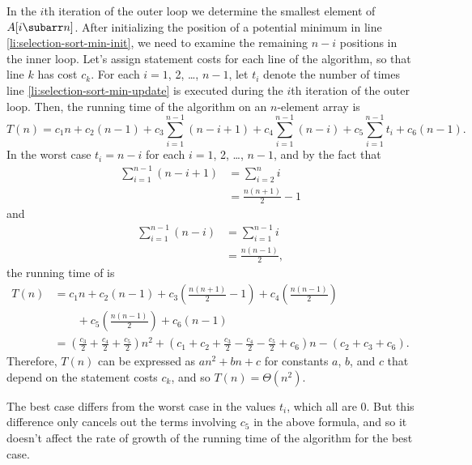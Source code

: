 In the $i$th iteration of the outer  loop we determine the smallest element of $A[i\subarr n]$.
After initializing the position of a potential minimum in line \ref{li:selection-sort-min-init}, we need to examine the remaining $n-i$ positions in the inner  loop.
Let's assign statement costs for each line of the algorithm, so that line $k$ has cost $c_k$.
For each $i=1$, 2, \dots, $n-1$, let $t_i$ denote the number of times line \ref{li:selection-sort-min-update} is executed during the $i$th iteration of the outer  loop.
Then, the running time of the algorithm on an $n$-element array is
\[
    T(n) = c_1n+c_2(n-1)+c_3\sum_{i=1}^{n-1}(n-i+1)+c_4\sum_{i=1}^{n-1}(n-i)+c_5\sum_{i=1}^{n-1}t_i+c_6(n-1).
\]
In the worst case $t_i=n-i$ for each $i=1$, 2, \dots, $n-1$, and by the fact that
\begin{align*}
    \sum_{i=1}^{n-1}(n-i+1) &= \sum_{i=2}^ni \\[1mm]
    &= \frac{n(n+1)}{2}-1
\end{align*}
and
\begin{align*}
    \sum_{i=1}^{n-1}(n-i) &= \sum_{i=1}^{n-1}i \\[1mm]
    &= \frac{n(n-1)}{2},
\end{align*}
the running time of  is
\begin{align*}
    T(n) &= c_1n+c_2(n-1)+c_3\left(\frac{n(n+1)}{2}-1\right)+c_4\left(\frac{n(n-1)}{2}\right) \\
    &\qquad {}+c_5\left(\frac{n(n-1)}{2}\right)+c_6(n-1) \\[1mm]
    &= \left(\frac{c_3}{2}+\frac{c_4}{2}+\frac{c_5}{2}\right)n^2\!+\left(c_1+c_2+\frac{c_3}{2}-\frac{c_4}{2}-\frac{c_5}{2}+c_6\right)n-(c_2+c_3+c_6).
\end{align*}
Therefore, $T(n)$ can be expressed as $an^2+bn+c$ for constants $a$, $b$, and $c$ that depend on the statement costs $c_k$, and so $T(n)=\Theta(n^2)$.

The best case differs from the worst case in the values $t_i$, which all are 0.
But this difference only cancels out the terms involving $c_5$ in the above formula, and so it doesn't affect the rate of growth of the running time of the algorithm for the best case.
